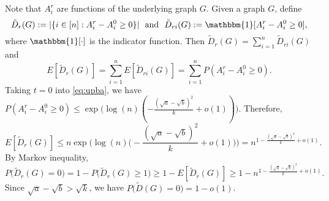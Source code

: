 \documentclass{article}
\begin{document}
Note that $A^r_i$ are functions of the underlying graph $G$.
Given a graph $G$, define 
$$
\tilde{D}_r(G):=|\{i\in[n]:A^r_i- A^0_i\ge 0\}|
\text{~~and~~}
\tilde{D}_{ri}(G):=\mathbbm{1}[A^r_i- A^0_i\ge 0] ,
$$
where $\mathbbm{1}[\cdot]$ is the indicator function. Then
$\tilde{D}_r(G)=\sum_{i=1}^n \tilde{D}_{ri}(G)$ and
$$
E[\tilde{D}_r(G)]=\sum_{i=1}^n E[\tilde{D}_{ri}(G)]
=\sum_{i=1}^n P( A^r_i- A^0_i\ge 0).
$$
Taking $t=0$ into \eqref{eq:upba}, we have
$P(A^r_i- A^0_i\ge 0)\le \exp\big(\log(n)(-\frac{(\sqrt{a}-\sqrt{b})^2}{k} +o(1)) \big)$. Therefore,
$$
E[\tilde{D}_r(G)]\le n \exp\Big(\log(n)\big(-\frac{(\sqrt{a}-\sqrt{b})^2}{k} +o(1) \big) \Big)
= n^{1-\frac{(\sqrt{a}-\sqrt{b})^2}{k} +o(1)}.
$$
By Markov inequality,
\begin{equation} \label{eq:tD}
P\big(\tilde{D}_r(G)=0 \big) = 1-
P\big(\tilde{D}_r(G)\ge 1\big) \ge 1- E[\tilde{D}_r(G)]
\ge 1- n^{1-\frac{(\sqrt{a}-\sqrt{b})^2}{k} +o(1)} .
\end{equation}
Since $\sqrt{a}-\sqrt{b} > \sqrt{k}$, we have
$P\big(\tilde{D}(G)=0 \big)= 1-o(1)$.
\end{document}
